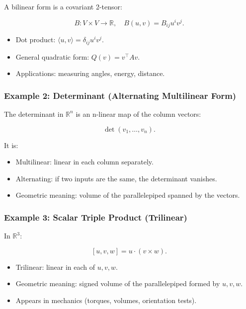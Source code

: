 \documentclass[
  letterpaper,
  DIV=11,
  numbers=noendperiod]{scrreprt}
\providecommand{\tightlist}{%
  \setlength{\itemsep}{0pt}\setlength{\parskip}{0pt}}
\begin{document}
A bilinear form is a covariant 2-tensor:

\[
B: V \times V \to \mathbb{R}, \quad B(u,v) = B_{ij} u^i v^j.
\]

\begin{itemize}
\tightlist
\item
  Dot product: \(\langle u,v \rangle = \delta_{ij} u^i v^j\).
\item
  General quadratic form: \(Q(v) = v^\top A v\).
\item
  Applications: measuring angles, energy, distance.
\end{itemize}

\subsubsection{Example 2: Determinant (Alternating Multilinear
Form)}\label{example-2-determinant-alternating-multilinear-form}

The determinant in \(\mathbb{R}^n\) is an n-linear map of the column
vectors:

\[
\det(v_1,\dots,v_n).
\]

It is:

\begin{itemize}
\tightlist
\item
  Multilinear: linear in each column separately.
\item
  Alternating: if two inputs are the same, the determinant vanishes.
\item
  Geometric meaning: volume of the parallelepiped spanned by the
  vectors.
\end{itemize}

\subsubsection{Example 3: Scalar Triple Product
(Trilinear)}\label{example-3-scalar-triple-product-trilinear}

In \(\mathbb{R}^3\):

\[
[u,v,w] = u \cdot (v \times w).
\]

\begin{itemize}
\tightlist
\item
  Trilinear: linear in each of \(u,v,w\).
\item
  Geometric meaning: signed volume of the parallelepiped formed by
  \(u,v,w\).
\item
  Appears in mechanics (torques, volumes, orientation tests).
\end{itemize}
\end{document}
